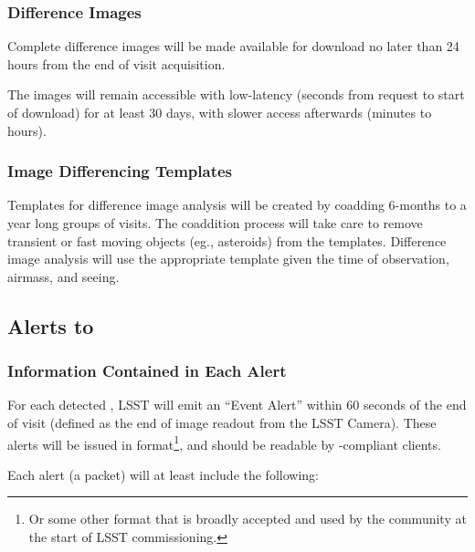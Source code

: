 \documentclass[SE,lsstdraft,toc]{lsstdoc}
\begin{document}
\subsubsection{Difference Images}
\label{sec:diffims}

Complete difference images will be made available for download no later than 24 hours from the end of visit acquisition.

The images will remain accessible with low-latency (seconds from request to start of download) for at least 30 days, with slower access afterwards (minutes to hours).

\subsubsection{Image Differencing Templates}
\label{sec:templates}

Templates for difference image analysis will be created by coadding 6-months to a year long groups of visits. The coaddition process will take care to remove transient or fast moving objects (eg., asteroids) from the templates.
Difference image analysis will use the appropriate template given the time of observation, airmass, and seeing.

\subsection{Alerts to \DIASources}
\label{sec:voEventContents}

\subsubsection{Information Contained in Each Alert}

For each detected \DIASource, LSST will emit an ``Event Alert'' within 60 seconds of the end of visit (defined as the end of image readout from the LSST Camera). These alerts will be issued in \VOEvent format\footnote{Or some other format that is broadly accepted and used by the community at the start of LSST commissioning.}, and should be readable by \VOEvent-compliant clients.

Each alert (a \VOEvent packet) will at least include the following:
\end{document}
